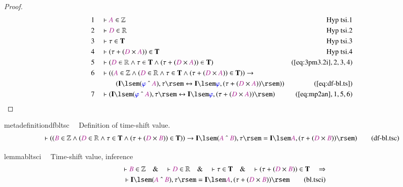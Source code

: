 \begin{proof}
\begin{align}
  1 &&  & \vdash \mc{A} \in \mathbb{Z}&\text{Hyp~tsi.1}\notag%
  \\ 2 &&  & \vdash \mc{D} \in \mathbb{R}&\text{Hyp~tsi.2}\notag%
  \\ 3 &&  & \vdash \tau \in \mathbf{T}&\text{Hyp~tsi.3}\notag%
  \\ 4 &&  & \vdash ( \tau + ( \mc{D} \times \mc{A} ) ) \in
      \mathbf{T}&\text{Hyp~tsi.4}\notag%
  \\ 5 &&  & \vdash ( \mc{D} \in \mathbb{R} \wedge \tau \in \mathbf{T} \wedge (
      \tau + ( \mc{D} \times \mc{A} ) ) \in \mathbf{T}
      )&(\mbox{\ref{eq:3pm3.2i}},2,3,4)\notag
  \\ 6 &&  & \vdash ( ( \mc{A} \in \mathbb{Z} \wedge ( \mc{D} \in \mathbb{R}
      \wedge \tau \in \mathbf{T} \wedge ( \tau + ( \mc{D}
      \times \mc{A} ) ) \in \mathbf{T} ) ) \rightarrow  \notag \\ & & & \qquad
      (
      \mathbf{I} \lsem ( \mw{\varphi} ~\string^~ \mc{A} ) ,
      \tau \rsem \leftrightarrow \mathbf{I} \lsem
      \mw{\varphi} , ( \tau + ( \mc{D} \times \mc{A} ) )
      \rsem ) )&(\mbox{\ref{eq:df-bl.ts}})\notag
  \\ 7 &&  & \vdash ( \mathbf{I} \lsem ( \mw{\varphi} ~\string^~ \mc{A} ) ,
      \tau \rsem \leftrightarrow \mathbf{I} \lsem
      \mw{\varphi} , ( \tau + ( \mc{D} \times \mc{A} ) )
      \rsem )&(\mbox{\ref{eq:mp2an}},1,5,6)\notag
\end{align}
\end{proof}

\begin{restatable}{metadefinition}{dfbltsc}~~ Definition of time-shift value.
\begin{align}
\vdash ( ( \mc{B} \in \mathbb{Z} \wedge ( \mc{D} \in \mathbb{R} \wedge \tau \in
    \mathbf{T} \wedge ( \tau + ( \mc{D} \times \mc{B} ) ) \in \mathbf{T} ) )
    \rightarrow \mathbf{I} \lsem ( \mc{A} ~\string^~ \mc{B} ) , \tau \rsem =
    \mathbf{I} \lsem \mc{A} , ( \tau + ( \mc{D} \times \mc{B} ) ) \rsem
    )\label{eq:df-bl.tsc}\tag{df-bl.tsc}
\end{align}
\end{restatable}

\begin{restatable}{lemma}{bltsci}~~ Time-shift value, inference
\begin{align}
\vdash \mc{B} \in \mathbb{Z}\quad\&\quad \vdash \mc{D} \in
    \mathbb{R}\quad\&\quad \vdash \tau \in \mathbf{T}\quad\&\quad \vdash ( \tau
    + ( \mc{D} \times \mc{B} ) ) \in \mathbf{T}\quad\Rightarrow \notag \\ %
      \quad \vdash
    \mathbf{I} \lsem ( \mc{A} ~\string^~ \mc{B} ) , \tau \rsem = \mathbf{I}
    \lsem \mc{A} , ( \tau + ( \mc{D} \times \mc{B} ) )
    \rsem\label{eq:bl.tsci}\tag{bl.tsci}
\end{align}
\end{restatable}

